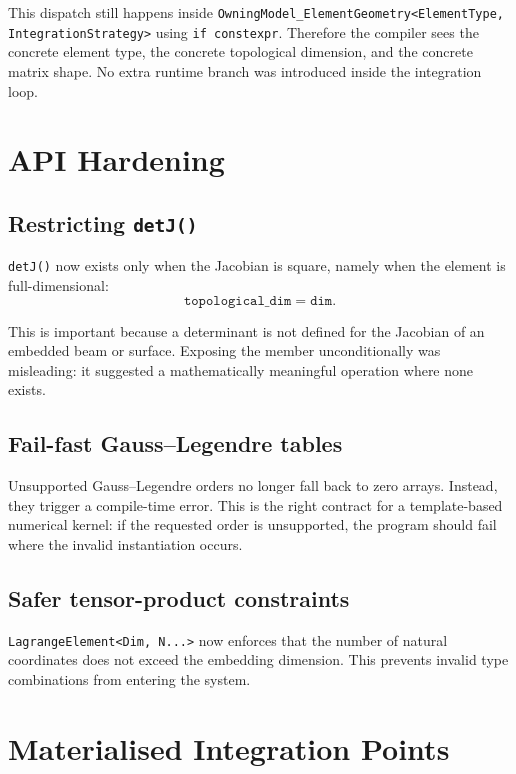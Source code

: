 This dispatch still happens inside
\texttt{OwningModel\_ElementGeometry<ElementType, IntegrationStrategy>} using
\texttt{if constexpr}.  Therefore the compiler sees the concrete element type,
the concrete topological dimension, and the concrete matrix shape.  No extra
runtime branch was introduced inside the integration loop.


\section{API Hardening}
\label{sec:eg_api_hardening}

\subsection{Restricting \texttt{detJ()}}

\texttt{detJ()} now exists only when the Jacobian is square, namely when the
element is full-dimensional:
\[
\texttt{topological\_dim} = \texttt{dim}.
\]

This is important because a determinant is not defined for the Jacobian of an
embedded beam or surface.  Exposing the member unconditionally was misleading:
it suggested a mathematically meaningful operation where none exists.

\subsection{Fail-fast Gauss--Legendre tables}

Unsupported Gauss--Legendre orders no longer fall back to zero arrays.
Instead, they trigger a compile-time error.  This is the right contract for a
template-based numerical kernel: if the requested order is unsupported, the
program should fail where the invalid instantiation occurs.

\subsection{Safer tensor-product constraints}

\texttt{LagrangeElement<Dim, N...>} now enforces that the number of natural
coordinates does not exceed the embedding dimension.  This prevents invalid
type combinations from entering the system.


\section{Materialised Integration Points}
\label{sec:eg_integration_points}

